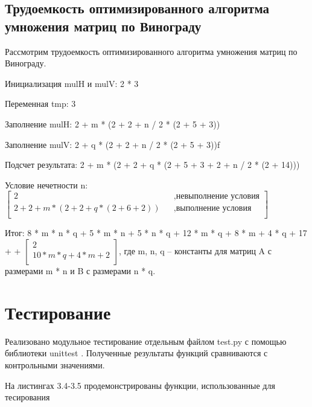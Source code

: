 \documentclass[12pt]{report}
\begin{document}
\subsection{Трудоемкость оптимизированного алгоритма умножения матриц по Винограду}
Рассмотрим трудоемкость оптимизированного алгоритма умножения матриц по Винограду.\vspace{\baselineskip}

Инициализация mulH и mulV: 2 * 3\vspace{\baselineskip}

Переменная tmp: 3\vspace{\baselineskip}

Заполнение mulH: 2 + m * (2 + 2 + n / 2 * (2 + 5 + 3))\vspace{\baselineskip}

Заполнение mulV: 2 + q * (2 + 2 + n / 2 * (2 + 5 + 3))\vspace{\baselineskip}ƒ

Подсчет результата: 2 + m * (2 + 2 + q * (2 + 5 + 3 + 2 + n / 2 * (2 + 14)))\vspace{\baselineskip}


Условие нечетности n: $\begin{bmatrix}
	2    &&, \text{невыполнение условия}\\
	2 + 2 + m * (2 + 2 + q * (2 + 6 + 2)) &&, \text{выполнение условия}\\
\end{bmatrix} $ \\
\vspace{\baselineskip}

Итог: 8 * m * n * q + 5 * m * n + 5 * n * q + 12 * m * q + 8 * m + 4 * q + 17 + + $\begin{bmatrix}
	2    \\
	10*m*q + 4*m + 2\\
\end{bmatrix} $, где m, n, q – константы для матриц A с размерами m * n и B с размерами n * q.

\newpage
\section{Тестирование}
Реализовано модульное тестирование отдельным файлом test.py с помощью библиотеки unittest \cite{unittest}. Полученные результаты функций сравниваются с контрольными значениями. \vspace{\baselineskip}

На  листингах 3.4-3.5 продемонстрированы функции, использованные для тесирования
\end{document}
